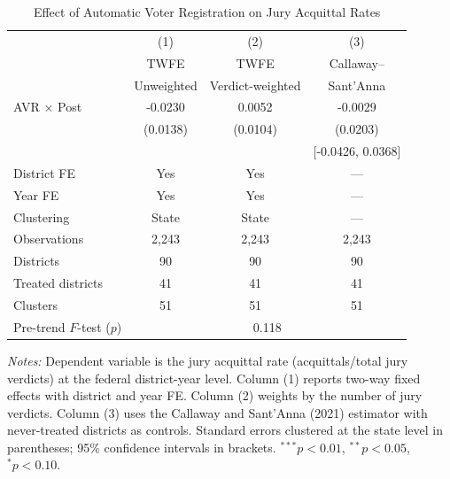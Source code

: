 \begin{table}[htbp]
\centering
\caption{Effect of Automatic Voter Registration on Jury Acquittal Rates}
\label{tab:main}
\begin{tabular}{lccc}
\hline\hline
 & (1) & (2) & (3) \\
 & TWFE & TWFE & Callaway-- \\
 & Unweighted & Verdict-weighted & Sant'Anna \\
\hline
AVR $\times$ Post & -0.0230 & 0.0052 & -0.0029 \\
 & (0.0138) & (0.0104) & (0.0203) \\
 & & & [-0.0426, 0.0368] \\
\hline
District FE & Yes & Yes & --- \\
Year FE & Yes & Yes & --- \\
Clustering & State & State & --- \\
Observations & 2,243 & 2,243 & 2,243 \\
Districts & 90 & 90 & 90 \\
Treated districts & 41 & 41 & 41 \\
Clusters & 51 & 51 & 51 \\
Pre-trend $F$-test ($p$) & \multicolumn{3}{c}{0.118} \\
\hline\hline
\end{tabular}
\begin{tablenotes}
\item \textit{Notes:} Dependent variable is the jury acquittal rate (acquittals/total jury verdicts) at the federal district-year level. Column (1) reports two-way fixed effects with district and year FE. Column (2) weights by the number of jury verdicts. Column (3) uses the Callaway and Sant'Anna (2021) estimator with never-treated districts as controls. Standard errors clustered at the state level in parentheses; 95\% confidence intervals in brackets. $^{***}p<0.01$, $^{**}p<0.05$, $^{*}p<0.10$.
\end{tablenotes}
\end{table}

